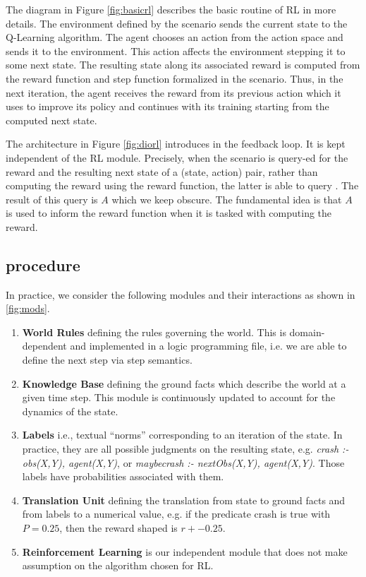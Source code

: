 The diagram in Figure \ref{fig:basicrl} describes the basic routine of RL in more details. The environment defined by the scenario sends the current state 
to the Q-Learning algorithm. The agent chooses an action from the action space and sends it to the environment. This action affects the environment stepping it to some next state. 
The resulting state along its associated reward is computed from the reward function and step function formalized in the scenario. Thus, in the next iteration, the 
agent receives the reward from its previous action which it uses to improve its policy and continues with its training starting from the computed next state.  

\medskip 

The architecture in Figure \ref{fig:diorl} introduces \dio{} in the feedback loop. It is kept independent of the RL module. Precisely, when the scenario is query-ed for the reward and 
the resulting next state of a (state, action) pair, rather than computing the reward using the reward function, the latter is able to query \dio{}. The result of this query is $A$ which we keep 
obscure. The fundamental idea is that $A$ is used to inform the reward function when it is tasked with computing the reward. 
 

\subsection{\dio{} procedure}
\label{sec:modules}
In practice, we consider the following modules and their interactions as shown in \ref{fig:mods}.

\begin{enumerate}
  \item \textbf{World Rules} defining the rules governing the world. This is domain-dependent and implemented 
        in a logic programming file, i.e. we are able to define the next step via step semantics.
  \item \textbf{Knowledge Base} defining the ground facts which describe the world at a given time step. This module is 
        continuously updated to account for the dynamics of the
        state.
  \item \textbf{Labels} i.e., textual ``norms'' corresponding to an
  iteration of the state. In practice, they are all possible judgments on the resulting state, e.g. \textit{crash :- obs(X,Y), agent(X,Y)}, 
                  or \textit{maybecrash :- nextObs(X,Y), agent(X,Y)}. 
                    Those labels have probabilities associated with
                    them.
  \item \textbf{Translation Unit} defining the translation from state to ground facts and from labels to a numerical value, e.g. if the predicate crash is true with $P = 0.25$, then the reward shaped is $r + -0.25$. 
  \item \textbf{Reinforcement Learning} is our independent module that does not make assumption on the algorithm chosen for RL.
\end{enumerate}


